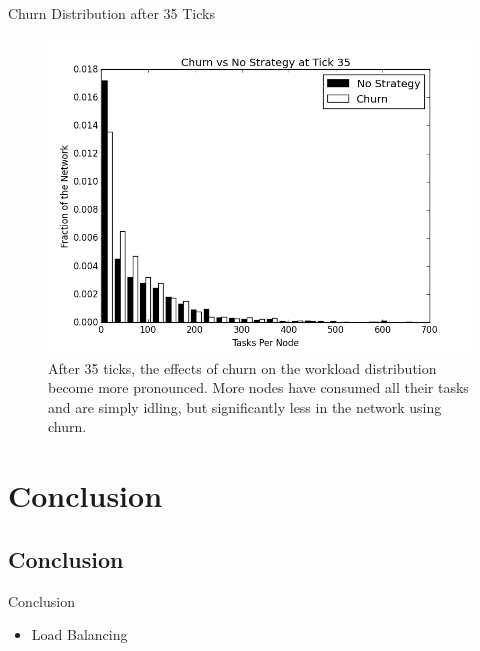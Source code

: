 \documentclass[11pt]{beamer}
\begin{document}
\begin{frame}{Churn Distribution after 35 Ticks}
\begin{figure}
	\centering
	\includegraphics[width=0.7\linewidth]{figs/ChurnStableHist35}
	\caption[Workload for churn at tick 35]{After 35 ticks, the effects of churn on the workload distribution become more pronounced.  More nodes have consumed all their tasks and are simply idling, but significantly less in the network using churn.}
	\label{fig:churnStableHist35}
\end{figure}
\end{frame}



\section{Conclusion}

\subsection{Conclusion}

\begin{frame}{Conclusion}
	\begin{itemize}
		\item Load Balancing
	\end{itemize}
\end{frame}
\end{document}
